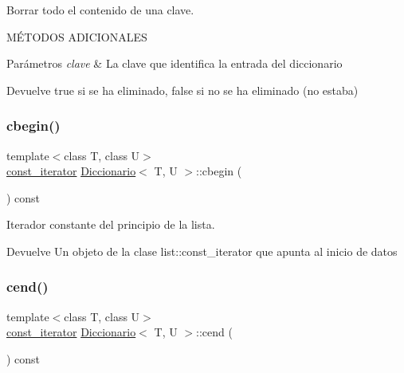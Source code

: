 Borrar todo el contenido de una clave. 

MÉ\+T\+O\+D\+OS A\+D\+I\+C\+I\+O\+N\+A\+L\+ES 
\begin{DoxyParams}{Parámetros}
{\em clave} & La clave que identifica la entrada del diccionario \\
\hline
\end{DoxyParams}
\begin{DoxyReturn}{Devuelve}
true si se ha eliminado, false si no se ha eliminado (no estaba) 
\end{DoxyReturn}
\mbox{\label{classDiccionario_a8d18a8044a6c1a1482762fd84ab37017}} 
\subsubsection{\texorpdfstring{cbegin()}{cbegin()}}
{\footnotesize\ttfamily template$<$class T, class U$>$ \\
\hyperlink{classDiccionario_1_1const__iterator}{const\+\_\+iterator} \hyperlink{classDiccionario}{Diccionario}$<$ T, U $>$\+::cbegin (\begin{DoxyParamCaption}{ }\end{DoxyParamCaption}) const}



Iterador constante del principio de la lista. 

\begin{DoxyReturn}{Devuelve}
Un objeto de la clase list\+::const\+\_\+iterator que apunta al inicio de datos 
\end{DoxyReturn}
\mbox{\label{classDiccionario_ac4e5b5c7800bf3df103ca6b58f118598}} 
\subsubsection{\texorpdfstring{cend()}{cend()}}
{\footnotesize\ttfamily template$<$class T, class U$>$ \\
\hyperlink{classDiccionario_1_1const__iterator}{const\+\_\+iterator} \hyperlink{classDiccionario}{Diccionario}$<$ T, U $>$\+::cend (\begin{DoxyParamCaption}{ }\end{DoxyParamCaption}) const}



